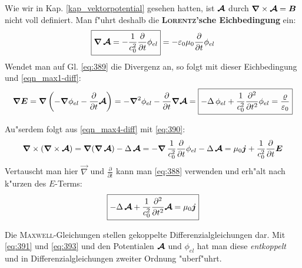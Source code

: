 Wie wir in Kap. \ref{kap_vektorpotential} gesehen hatten, ist $\boldsymbol{\mathcal{A}}$ durch $\boldsymbol{\nabla} \times \boldsymbol{\mathcal{A}} = \boldsymbol{B}$ nicht voll
definiert. Man f"uhrt deshalb die \textbf{\textsc{Lorentz}'sche Eichbedingung} ein:
\begin{equation}
   \label{eq:390}
   \boxed{ \boldsymbol{\nabla}\, \boldsymbol{\mathcal{A}} = - \frac{1}{c_0^2}
     \frac{\partial }{\partial t} \phi_{el} } = -\varepsilon_0\mu_0    \frac{\partial }{\partial t} \phi_{el}
\end{equation}
Wendet man auf Gl. \eqref{eq:389} die Divergenz an, so folgt mit
dieser Eichbedingung und \eqref{eqn_max1-diff}:
\begin{equation}
   \label{eq:391}
   \boldsymbol{\nabla} \boldsymbol{E}
=
 \boldsymbol{\nabla}\left( - \boldsymbol{\nabla} \phi_{el} - \frac{\partial }{\partial
      t}\boldsymbol{\mathcal{A}}\right)
=
-\boldsymbol{\nabla}^2\phi_{el} - \frac{\partial }{\partial
  t}\boldsymbol{\nabla}\boldsymbol{\mathcal{A}}
=
\boxed{
-\Delta \,{\phi_{el}}+\frac{1}{c_0^2}
     \frac{\partial^2 }{\partial t^2} \phi_{el}  =
   \frac{\varrho}{\varepsilon_0}
}
\end{equation}

Au"serdem folgt aus \eqref{eqn_max4-diff} mit \eqref{eq:390}:
\begin{equation*}
   \label{eq:392}
\boldsymbol{\nabla}\times(\boldsymbol{\nabla}\times\boldsymbol{\mathcal{A}})
=
 \boldsymbol{\nabla}(\boldsymbol{\nabla}\,
\boldsymbol{\mathcal{A}}) - \Delta \,{\boldsymbol{\mathcal{A}}}
=
- \boldsymbol{\nabla}\,   \frac{1}{c_0^2}
     \frac{\partial }{\partial t} \phi_{el}  - \Delta \,{\boldsymbol{\mathcal{A}}}
=
\mu_0\boldsymbol{j} + \frac{1}{c_0^2}\frac{\partial }{\partial t}\boldsymbol{E}
\end{equation*}
Vertauscht man hier $\vec\nabla$ und $\frac{\partial }{\partial t}$
kann man \eqref{eq:388} verwenden und erh"alt nach k"urzen des $E$-Terms:
\begin{equation}
   \label{eq:393}
   \boxed{ - \Delta \,{\boldsymbol{\mathcal{A}}} + \frac{1}{c_0^2}\frac{\partial^2
     }{\partial t^2} \boldsymbol{\mathcal{A}} = \mu_0 \boldsymbol{j}}
\end{equation}

\begin{Wichtig}
   Die \textsc{Maxwell}-Gleichungen stellen gekoppelte
   Differenzialgleichungen dar. Mit \eqref{eq:391} und \eqref{eq:393}
   und den Potentialen $\boldsymbol{\mathcal{A}}$ und $\phi_{el}$ hat man diese
   \emph{entkoppelt} und in Differenzialgleichungen zweiter Ordnung "uberf"uhrt.
\end{Wichtig}








